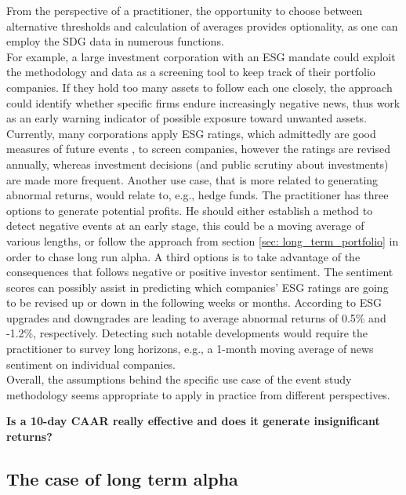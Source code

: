 From the perspective of a practitioner, the opportunity to choose between alternative thresholds and calculation of averages provides optionality, as one can employ the SDG data in numerous functions. \\
For example, a large investment corporation with an ESG mandate could exploit the methodology and data as a screening tool to keep track of their portfolio companies. If they hold too many assets to follow each one closely, the approach could identify whether specific firms endure increasingly negative news, thus work as an early warning indicator of possible exposure toward unwanted assets. Currently, many corporations apply ESG ratings, which admittedly are good measures of future events \citep{serafeim2022stock}, to screen companies, however the ratings are revised annually, whereas investment decisions (and public scrutiny about investments) are made more frequent. Another use case, that is more related to generating abnormal returns, would relate to, e.g., hedge funds. The practitioner has three options to generate potential profits. He should either establish a method to detect negative events at an early stage, this could be a moving average of various lengths, or follow the approach from section \ref{sec: long_term_portfolio} in order to chase long run alpha. A third options is to take advantage of the consequences that follows negative or positive investor sentiment. The sentiment scores can possibly assist in predicting which companies' ESG ratings are going to be revised up or down in the following weeks or months. According to \cite{ESG_ratings_change} ESG upgrades and downgrades are leading to average abnormal returns of 0.5\% and -1.2\%, respectively. Detecting such notable developments would require the practitioner to survey long horizons, e.g., a 1-month moving average of news sentiment on individual companies. \\
Overall, the assumptions behind the specific use case of the event study methodology seems appropriate to apply in practice from different perspectives. 

\textbf{Is a 10-day CAAR really effective and does it generate insignificant returns?}


\subsection{The case of long term alpha}

